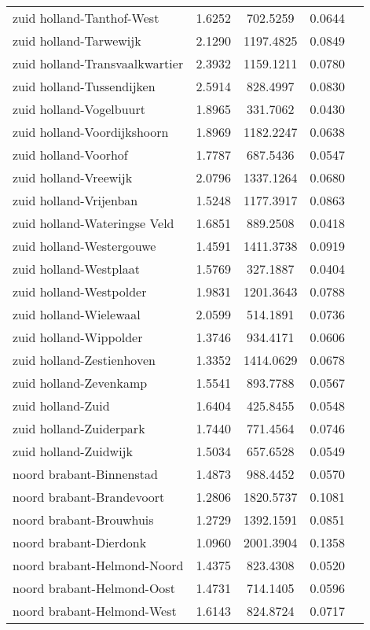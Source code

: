 \begin{longtable}{llccc}
zuid holland-Tanthof-West & 1.6252 & 702.5259 & 0.0644 \\
zuid holland-Tarwewijk & 2.1290 & 1197.4825 & 0.0849 \\
zuid holland-Transvaalkwartier & 2.3932 & 1159.1211 & 0.0780 \\
zuid holland-Tussendijken & 2.5914 & 828.4997 & 0.0830 \\
zuid holland-Vogelbuurt & 1.8965 & 331.7062 & 0.0430 \\
zuid holland-Voordijkshoorn & 1.8969 & 1182.2247 & 0.0638 \\
zuid holland-Voorhof & 1.7787 & 687.5436 & 0.0547 \\
zuid holland-Vreewijk & 2.0796 & 1337.1264 & 0.0680 \\
zuid holland-Vrijenban & 1.5248 & 1177.3917 & 0.0863 \\
zuid holland-Wateringse Veld & 1.6851 & 889.2508 & 0.0418 \\
zuid holland-Westergouwe & 1.4591 & 1411.3738 & 0.0919 \\
zuid holland-Westplaat & 1.5769 & 327.1887 & 0.0404 \\
zuid holland-Westpolder & 1.9831 & 1201.3643 & 0.0788 \\
zuid holland-Wielewaal & 2.0599 & 514.1891 & 0.0736 \\
zuid holland-Wippolder & 1.3746 & 934.4171 & 0.0606 \\
zuid holland-Zestienhoven & 1.3352 & 1414.0629 & 0.0678 \\
zuid holland-Zevenkamp & 1.5541 & 893.7788 & 0.0567 \\
zuid holland-Zuid & 1.6404 & 425.8455 & 0.0548 \\
zuid holland-Zuiderpark & 1.7440 & 771.4564 & 0.0746 \\
zuid holland-Zuidwijk & 1.5034 & 657.6528 & 0.0549 \\
noord brabant-Binnenstad & 1.4873 & 988.4452 & 0.0570 \\
noord brabant-Brandevoort & 1.2806 & 1820.5737 & 0.1081 \\
noord brabant-Brouwhuis & 1.2729 & 1392.1591 & 0.0851 \\
noord brabant-Dierdonk & 1.0960 & 2001.3904 & 0.1358 \\
noord brabant-Helmond-Noord & 1.4375 & 823.4308 & 0.0520 \\
noord brabant-Helmond-Oost & 1.4731 & 714.1405 & 0.0596 \\
noord brabant-Helmond-West & 1.6143 & 824.8724 & 0.0717 \\

\end{longtable}
